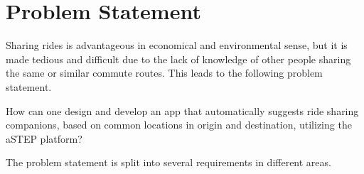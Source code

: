 \section{Problem Statement}
Sharing rides is advantageous in economical and environmental sense, but it is made tedious and   difficult due to the lack of knowledge of other people sharing the same or similar commute routes.  This leads to the following problem statement.

{\addtolength{\leftskip}{10mm}\addtolength{\rightskip}{10mm}\noindent\hrulefill\it

\noindent How can one design and develop an app that automatically suggests ride sharing companions, based on common locations in origin and destination, utilizing the aSTEP platform? 

\noindent\hrulefill

}

The problem statement is split into several requirements in different areas.